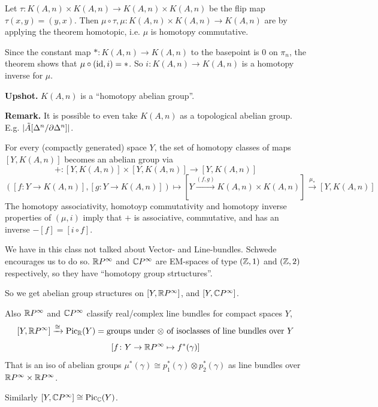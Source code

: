 \documentclass[language=english]{TemplateLecture}
\begin{document}
Let \(\tau\colon K(A,n)\times K(A,n)\to K(A,n)\times K(A,n)\) be the flip map \(\tau(x,y) = (y,x)\). Then \(\mu\circ \tau, \mu\colon K(A,n)\times K(A,n) \to K(A,n)\) are by applying the theorem homotopic, i.e. \(\mu\) is homotopy commutative.

Since the constant map \(*\colon K(A,n)\to K(A,n)\) to the basepoint is \(0\) on \(\pi_n\), the theorem shows that \(\mu \circ (\operatorname{id}, i) = *\). So \(i\colon K(A,n)\to K(A,n)\) is a homotopy inverse for \(\mu\).

\textbf{Upshot.} \(K(A,n)\) is a \enquote{homotopy abelian group}.

\textbf{Remark.} It is possible to even take \(K(A,n)\) as a topological abelian group. E.g. \(\lvert\tilde A[\Delta^n/\partial \Delta^n]\rvert\).

\begin{construction}
    For every (compactly generated) space \(Y\), the set of homotopy classes of maps \([Y, K(A,n)]\) becomes an abelian group via
    \[+ \colon [Y, K(A,n)]\times [Y, K(A,n)] \to [Y, K(A,n)]\]
    \[([f\colon Y\to K(A,n)], [g\colon Y\to K(A,n)]) \mapsto [Y\xrightarrow{(f,g)} K(A,n)\times K(A,n)]\xrightarrow{\mu_*} [Y, K(A,n)]\]
    The homotopy associativity, homotoyp commutativity and homotopy inverse properties of \((\mu, i)\) imply that \(+\) is associative, commutative, and has an inverse \(-[f] = [i\circ f]\).
\end{construction}


\begin{example}
    We have in this class not talked about Vector- and Line-bundles. Schwede encourages us to do so. \(\mathbb{R} P^\infty\) and \(\mathbb{C} P^\infty\) are EM-spaces of type \((\mathbb{Z}, 1)\) and \((\mathbb{Z}, 2)\) respectively, so they have \enquote{homotopy group strtuctures}.

    So we get abelian group structures on \([Y, \mathbb{R} P^\infty]\), and \([Y, \mathbb{C} P^\infty]\).

    Also \(\mathbb{R} P^\infty\) and \(\mathbb{C} P^\infty\) classify real/complex line bundles for compact spaces \(Y\),
    \[[Y, \mathbb{R} P^\infty] \xrightarrow{\cong} \mathrm{Pic}_{\mathbb{R}}(Y) = \text{groups under \(\otimes\) of isoclasses of line bundles over } Y\]
    \[[f\colon Y\to \mathbb{R} P^\infty \mapsto f^*(\gamma)]\]
    That is an iso of abelian groups \(\mu^*(\gamma) \cong p_1^*(\gamma) \otimes p_2^*(\gamma)\) as line bundles over \(\mathbb{R} P^\infty\times \mathbb{R} P^\infty\).

    Similarly \([Y, \mathbb{C} P^\infty] \cong \mathrm{Pic}_{\mathbb{C}} (Y)\).
\end{example}
\end{document}
